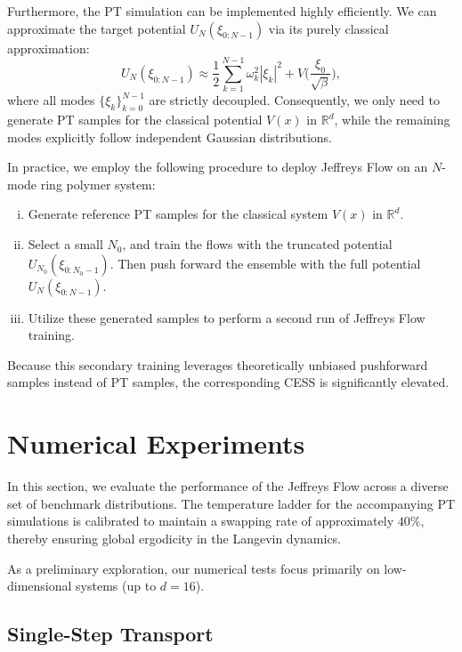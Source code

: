 \documentclass[%
 reprint,
 amsmath,amssymb,
 aps,
 pre,
]{revtex4-2}
\newcommand{\setzero}{\setlength{\itemsep}{0pt}}
\begin{document}
Furthermore, the PT simulation can be implemented highly efficiently. We can approximate the target potential $U_N(\xi_{0:N-1})$ via its purely classical approximation:
\begin{equation*}
	U_N(\xi_{0:N-1}) \approx \frac{1}{2} \sum_{k=1}^{N-1} \omega_k^2 |\xi_k|^2 + V\bigg(\frac{\xi_0}{\sqrt{\beta}}\bigg),
\end{equation*}
where all modes $\{\xi_k\}_{k=0}^{N-1}$ are strictly decoupled. Consequently, we only need to generate PT samples for the classical potential $V(x)$ in $\mathbb{R}^d$, while the remaining modes explicitly follow independent Gaussian distributions.

In practice, we employ the following procedure to deploy Jeffreys Flow on an $N$-mode ring polymer system:
\begin{enumerate}[(i)]
	\setzero
	\item Generate reference PT samples for the classical system $V(x)$ in $\mathbb{R}^d$.
	\item Select a small $N_0$, and train the flows with the truncated potential $U_{N_0}(\xi_{0:N_0-1})$. Then push forward the ensemble with the full potential $U_N(\xi_{0:N-1})$.
	\item Utilize these generated samples to perform a second run of Jeffreys Flow training.
\end{enumerate}
Because this secondary training leverages theoretically unbiased pushforward samples instead of PT samples, the corresponding CESS is significantly elevated.

\mbox{}

\section{Numerical Experiments}

In this section, we evaluate the performance of the Jeffreys Flow across a diverse set of benchmark distributions. The temperature ladder for the accompanying PT simulations is calibrated to maintain a swapping rate of approximately $40\%$, thereby ensuring global ergodicity in the Langevin dynamics.

As a preliminary exploration, our numerical tests focus primarily on low-dimensional systems (up to $d=16$).

\subsection{Single-Step Transport}
\end{document}
